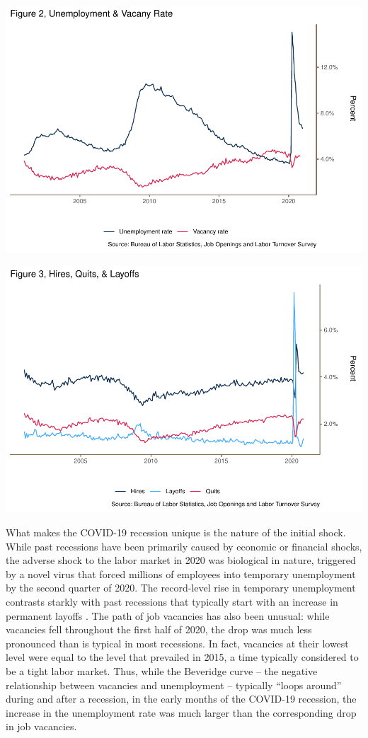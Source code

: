 \documentclass[
  11pt,
]{article}
\begin{document}
\begin{center}\includegraphics{JOLTS_files/figure-latex/unnamed-chunk-6-1} \end{center}

\begin{center}\includegraphics{JOLTS_files/figure-latex/unnamed-chunk-7-1} \end{center}

What makes the COVID-19 recession unique is the nature of the initial
shock. While past recessions have been primarily caused by economic or
financial shocks, the adverse shock to the labor market in 2020 was
biological in nature, triggered by a novel virus that forced millions of
employees into temporary unemployment by the second quarter of 2020. The
record-level rise in temporary unemployment contrasts starkly with past
recessions that typically start with an increase in permanent layoffs
\citep{elsby10}. The path of job vacancies has also been unusual: while
vacancies fell throughout the first half of 2020, the drop was much less
pronounced than is typical in most recessions. In fact, vacancies at
their lowest level were equal to the level that prevailed in 2015, a
time typically considered to be a tight labor market. Thus, while the
Beveridge curve -- the negative relationship between vacancies and
unemployment -- typically ``loops around'' during and after a recession,
in the early months of the COVID-19 recession, the increase in the
unemployment rate was much larger than the corresponding drop in job
vacancies.
\end{document}
